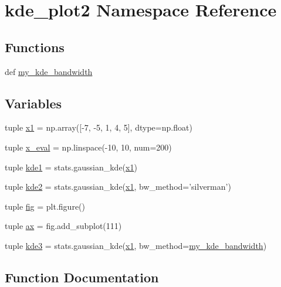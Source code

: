 \hypertarget{namespacekde__plot2}{}\section{kde\+\_\+plot2 Namespace Reference}
\label{namespacekde__plot2}
\subsection*{Functions}
\begin{DoxyCompactItemize}
\item 
def \hyperlink{namespacekde__plot2_a4c8ebd6c29b366d869a70669a66f8ded}{my\+\_\+kde\+\_\+bandwidth}
\end{DoxyCompactItemize}
\subsection*{Variables}
\begin{DoxyCompactItemize}
\item 
tuple \hyperlink{namespacekde__plot2_aa1b71a356140949d1edcdbbf4ca00440}{x1} = np.\+array(\mbox{[}-\/7, -\/5, 1, 4, 5\mbox{]}, dtype=np.\+float)
\item 
tuple \hyperlink{namespacekde__plot2_a734bf2167f68a2466252afc30903e0f3}{x\+\_\+eval} = np.\+linspace(-\/10, 10, num=200)
\item 
tuple \hyperlink{namespacekde__plot2_ac99334c084e5b399d835d858273f09ad}{kde1} = stats.\+gaussian\+\_\+kde(\hyperlink{namespacekde__plot2_aa1b71a356140949d1edcdbbf4ca00440}{x1})
\item 
tuple \hyperlink{namespacekde__plot2_af20b63ed157bf90119ab9b0c9ffbd18c}{kde2} = stats.\+gaussian\+\_\+kde(\hyperlink{namespacekde__plot2_aa1b71a356140949d1edcdbbf4ca00440}{x1}, bw\+\_\+method='silverman')
\item 
tuple \hyperlink{namespacekde__plot2_a1141844c8acb7a67f1757ac5c2c03169}{fig} = plt.\+figure()
\item 
tuple \hyperlink{namespacekde__plot2_aec0eac705ceec99cd4e45e5632b09bc8}{ax} = fig.\+add\+\_\+subplot(111)
\item 
tuple \hyperlink{namespacekde__plot2_a08bb55a4384ccf29ab99a812955824d4}{kde3} = stats.\+gaussian\+\_\+kde(\hyperlink{namespacekde__plot2_aa1b71a356140949d1edcdbbf4ca00440}{x1}, bw\+\_\+method=\hyperlink{namespacekde__plot2_a4c8ebd6c29b366d869a70669a66f8ded}{my\+\_\+kde\+\_\+bandwidth})
\end{DoxyCompactItemize}


\subsection{Function Documentation}
\hypertarget{namespacekde__plot2_a4c8ebd6c29b366d869a70669a66f8ded}{}

